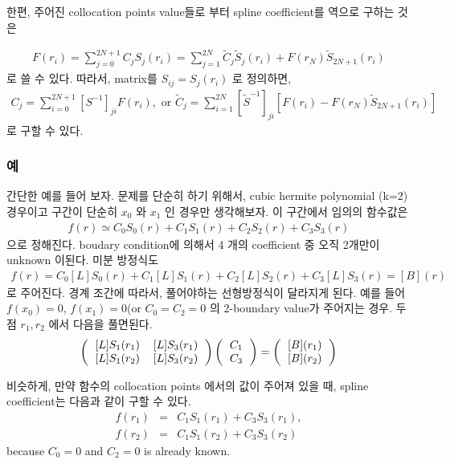 \documentclass[10pt]{article}
\newcommand{\bea}{\begin{eqnarray}}
\newcommand{\eea}{\end{eqnarray}}
\newcommand{\no}{\nonumber \\}
\begin{document}
한편, 주어진 collocation points value들로 부터 spline coefficient를 역으로
구하는 것은

\bea
F(r_i)=\sum_{j=0}^{2N+1} C_j S_j(r_i)
      =\sum_{j=1}^{2N} \tilde{C}_j \tilde{S}_j(r_i) 
                     +F(r_N)\tilde{S}_{2N+1}(r_i)
\eea 
로 쓸 수 있다. 따라서, matrix를
$S_{ij}=S_j(r_i)$ 로 정의하면,
\bea
C_j=\sum_{i=0}^{2N+1} [S^{-1}]_{ji} F(r_i),\mbox{ or }
\tilde{C}_j=\sum_{i=1}^{2N}[\tilde{S}^{-1}]_{ji}
                [F(r_i)-F(r_N)\tilde{S}_{2N+1}(r_i)]
\eea
로 구할 수 있다.

\subsubsection{예}
간단한 예를 들어 보자. 문제를 단순히 하기 위해서, cubic hermite polynomial (k=2)
경우이고 구간이 단순히 $x_0$ 와 $x_1$ 인 경우만 생각해보자. 이 구간에서
임의의 함수값은
\bea
f(r)\simeq C_0 S_0(r)+C_1 S_1(r)+C_2 S_2(r)+C_3 S_3(r)
\eea
으로 정해진다. boudary condition에 의해서 4 개의 coefficient 중 오직 
2개만이 unknown 이된다. 미분 방정식도
\bea
[L]f(r)=C_0 [L]S_0(r)+ C_1[L]S_1(r)+ C_2 [L]S_2(r)+ C_3 [L] S_3(r)=[B](r)
\eea
로 주어진다. 경계 조간에 따라서, 풀어야하는 선형방정식이 달라지게 된다.
예를 들어 $f(x_0)=0$, $f(x_1)=0$(or $C_0=C_2=0$ 
의 2-boundary value가 주어지는 경우.
두 점 $r_1, r_2$ 에서 다음을 풀면된다.
\begin{equation}
\left(\begin{tabular}{cc} $[L]S_1(r_1)$ & $[L]S_3(r_1)$ \\
                          $[L]S_1(r_2)$ & $[L]S_3(r_2)$ \end{tabular}
\right)\left( \begin{tabular}{c} $C_1$ \\ $C_3$ \end{tabular}\right)
=\left( \begin{tabular}{c} $[B](r_1)$ \\ $[B](r_2)$ \end{tabular}\right)
\end{equation}

비슷하게, 만약 함수의 collocation points 에서의 값이 주어져 있을 때,
spline coefficient는 다음과 같이 구할 수 있다.
\bea
f(r_1)&=& C_1 S_1(r_1)+ C_3 S_3(r_1),\no
f(r_2)&=& C_1 S_1(r_2)+ C_3 S_3(r_2)
\eea
because $C_0=0$ and $C_2=0$ is already known.
\end{document}
